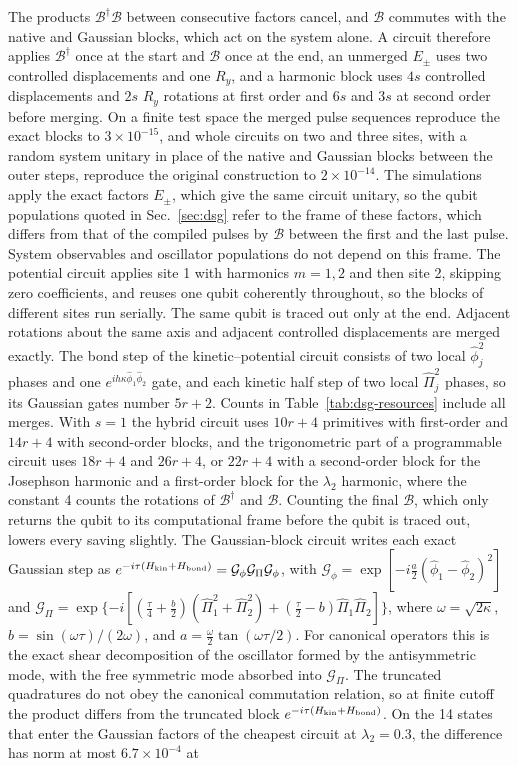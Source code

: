 \documentclass[pra,twocolumn,superscriptaddress,nofootinbib,floatfix]{revtex4-2}
\theoremstyle{remark}
\begin{document}
The products \(\mathcal B^\dagger\mathcal B\) between consecutive factors cancel, and \(\mathcal B\) commutes with the native and Gaussian blocks, which act on the system alone. A circuit therefore applies \(\mathcal B^\dagger\) once at the start and \(\mathcal B\) once at the end, an unmerged \(E_\pm\) uses two controlled displacements and one \(R_y\), and a harmonic block uses \(4s\) controlled displacements and \(2s\) \(R_y\) rotations at first order and \(6s\) and \(3s\) at second order before merging. On a finite test space the merged pulse sequences reproduce the exact blocks to \(3\times10^{-15}\), and whole circuits on two and three sites, with a random system unitary in place of the native and Gaussian blocks between the outer steps, reproduce the original construction to \(2\times10^{-14}\). The simulations apply the exact factors \(E_\pm\), which give the same circuit unitary, so the qubit populations quoted in Sec.~\ref{sec:dsg} refer to the frame of these factors, which differs from that of the compiled pulses by \(\mathcal B\) between the first and the last pulse. System observables and oscillator populations do not depend on this frame. The potential circuit applies site 1 with harmonics \(m=1,2\) and then site 2, skipping zero coefficients, and reuses one qubit coherently throughout, so the blocks of different sites run serially. The same qubit is traced out only at the end. Adjacent rotations about the same axis and adjacent controlled displacements are merged exactly. The bond step of the kinetic--potential circuit consists of two local \(\hat\phi_j^2\) phases and one \(e^{ih\kappa\hat\phi_1\hat\phi_2}\) gate, and each kinetic half step of two local \(\hat\Pi_j^2\) phases, so its Gaussian gates number \(5r+2\). Counts in Table~\ref{tab:dsg-resources} include all merges. With \(s=1\) the hybrid circuit uses \(10r+4\) primitives with first-order and \(14r+4\) with second-order blocks, and the trigonometric part of a programmable circuit uses \(18r+4\) and \(26r+4\), or \(22r+4\) with a second-order block for the Josephson harmonic and a first-order block for the \(\lambda_2\) harmonic, where the constant 4 counts the rotations of \(\mathcal B^\dagger\) and \(\mathcal B\). Counting the final \(\mathcal B\), which only returns the qubit to its computational frame before the qubit is traced out, lowers every saving slightly. The Gaussian-block circuit writes each exact Gaussian step as \(e^{-i\tau(H_{\rm kin}+H_{\rm bond})}=\mathcal G_\phi\mathcal G_\Pi\mathcal G_\phi\), with \(\mathcal G_\phi=\exp[-i\tfrac a2(\hat\phi_1-\hat\phi_2)^2]\) and \(\mathcal G_\Pi=\exp\{-i[(\tfrac\tau4+\tfrac b2)(\hat\Pi_1^2+\hat\Pi_2^2)+(\tfrac\tau2-b)\hat\Pi_1\hat\Pi_2]\}\), where \(\omega=\sqrt{2\kappa}\), \(b=\sin(\omega\tau)/(2\omega)\), and \(a=\tfrac\omega2\tan(\omega\tau/2)\). For canonical operators this is the exact shear decomposition of the oscillator formed by the antisymmetric mode, with the free symmetric mode absorbed into \(\mathcal G_\Pi\). The truncated quadratures do not obey the canonical commutation relation, so at finite cutoff the product differs from the truncated block \(e^{-i\tau(H_{\rm kin}+H_{\rm bond})}\). On the 14 states that enter the Gaussian factors of the cheapest circuit at \(\lambda_2=0.3\), the difference has norm at most \(6.7\times10^{-4}\) at 
\end{document}
